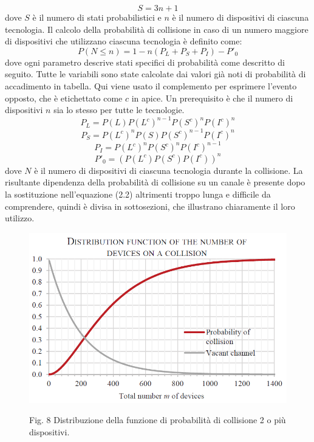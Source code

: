 \documentclass[a4paper]{report} %
\begin{document}
\begin{equation}
S = 3n + 1
\end{equation}
dove $S$ è il numero di stati probabilistici e $n$ è il numero di dispositivi di ciascuna tecnologia. Il calcolo della probabilità di collisione in caso di un numero maggiore di dispositivi che utilizzano ciascuna tecnologia è definito come:
\begin{equation}
P(N \leq n) = 1 - n(P_L + P_S + P_I) - P'_0
\end{equation}
dove ogni parametro descrive stati specifici di probabilità come descritto di seguito. Tutte le variabili sono state calcolate dai valori già noti di probabilità di accadimento in tabella. Qui viene usato il complemento per esprimere l'evento opposto, che è etichettato come $c$ in apice. Un prerequisito è che il numero di dispositivi $n$ sia lo stesso per tutte le tecnologie.
\begin{equation}
P_L = P(L)P(L^c)^{n-1}P(S^c)^nP(I^c)^n
\end{equation}
\begin{equation}
P_S = P(L^c)^nP(S)P(S^c)^{n-1}P(I^c)^n
\end{equation}
\begin{equation}
P_I = P(L^c)^nP(S^c)^nP(I^c)^{n-1}
\end{equation}
\begin{equation}
P'_0 = (P(L^c)P(S^c)P(I^c))^n
\end{equation}
dove $N$ è il numero di dispositivi di ciascuna tecnologia durante la collisione. La risultante dipendenza della probabilità di collisione su un canale è presente dopo la sostituzione nell'equazione (2.2) altrimenti troppo lunga e difficile da comprendere, quindi è divisa in sottosezioni, che illustrano chiaramente il loro utilizzo. %
\begin{figure}
\centering
\includegraphics[scale=.5]{Immagini/DistribuzioneDiProb.png}

Fig. 8 Distribuzione della funzione di probabilità di collisione 2 o più dispositivi.
\end{figure}
\end{document}
